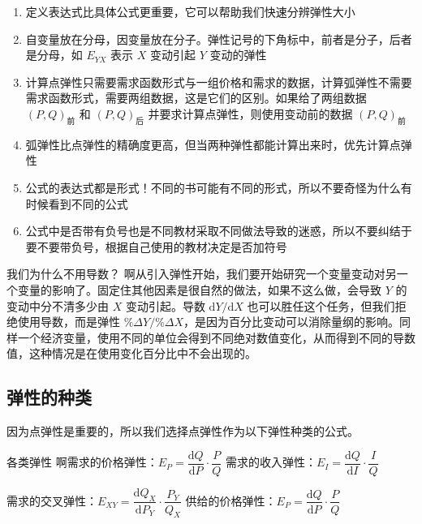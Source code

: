 \begin{enumerate}
    \item 定义表达式比具体公式更重要，它可以帮助我们快速分辨弹性大小
    \item 自变量放在分母，因变量放在分子。弹性记号的下角标中，前者是分子，后者是分母，如 $E_{YX}$ 表示 $X$ 变动引起 $Y$ 变动的弹性
    \item 计算点弹性只需要需求函数形式与一组价格和需求的数据，计算弧弹性不需要需求函数形式，需要两组数据，这是它们的区别。如果给了两组数据 $\left(P,Q\right)_{\text{前}}$ 和 $\left(P,Q\right)_{\text{后}}$ 并要求计算点弹性，则使用变动前的数据 $\left(P,Q\right)_{\text{前}}$
    \item 弧弹性比点弹性的精确度更高，但当两种弹性都能计算出来时，优先计算点弹性
    \item 公式的表达式都是形式！不同的书可能有不同的形式，所以不要奇怪为什么有时候看到不同的公式
    \item 公式中是否带有负号也是不同教材采取不同做法导致的迷惑，所以不要纠结于要不要带负号，根据自己使用的教材决定是否加符号
\end{enumerate}

\begin{ramble}[breakable]{我们为什么不用导数？}
    啊从引入弹性开始，我们要开始研究一个变量变动对另一个变量的影响了。固定住其他因素是很自然的做法，如果不这么做，会导致 $Y$ 的变动中分不清多少由 $X$ 变动引起。导数 $\mathrm dY/\mathrm dX$ 也可以胜任这个任务，但我们拒绝使用导数，而是弹性 $\%\Delta Y/\%\Delta X$，是因为百分比变动可以消除量纲的影响。同样一个经济变量，使用不同的单位会得到不同绝对数值变化，从而得到不同的导数值，这种情况是在使用变化百分比中不会出现的。
\end{ramble}

\subsection{弹性的种类}

因为点弹性是重要的，所以我们选择点弹性作为以下弹性种类的公式。

\begin{definition}[breakable]{各类弹性}
    啊需求的价格弹性：$E_{P}=\dfrac{\mathrm dQ}{\mathrm dP}\cdot\dfrac{P}{Q}$ \quad\quad 需求的收入弹性：$E_{I}=\dfrac{\mathrm dQ}{\mathrm dI}\cdot\dfrac{I}{Q}$
    \vspace{0.5em}

    需求的交叉弹性：$E_{XY}=\dfrac{\mathrm dQ_X}{\mathrm dP_Y}\cdot\dfrac{P_Y}{Q_X}$ \quad\quad 供给的价格弹性：$E_{P}=\dfrac{\mathrm dQ}{\mathrm dP}\cdot\dfrac{P}{Q}$
\end{definition}

